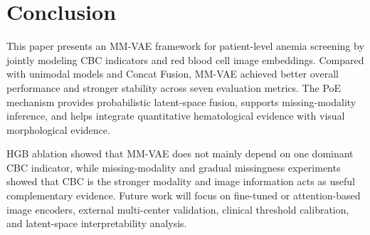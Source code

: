 \documentclass[conference]{IEEEtran}
\begin{document}
\FloatBarrier

\section{Conclusion}

This paper presents an MM-VAE framework for patient-level anemia screening by jointly modeling CBC indicators and red blood cell image embeddings. Compared with unimodal models and Concat Fusion, MM-VAE achieved better overall performance and stronger stability across seven evaluation metrics. The PoE mechanism provides probabilistic latent-space fusion, supports missing-modality inference, and helps integrate quantitative hematological evidence with visual morphological evidence.

HGB ablation showed that MM-VAE does not mainly depend on one dominant CBC indicator, while missing-modality and gradual missingness experiments showed that CBC is the stronger modality and image information acts as useful complementary evidence. Future work will focus on fine-tuned or attention-based image encoders, external multi-center validation, clinical threshold calibration, and latent-space interpretability analysis.
\end{document}
